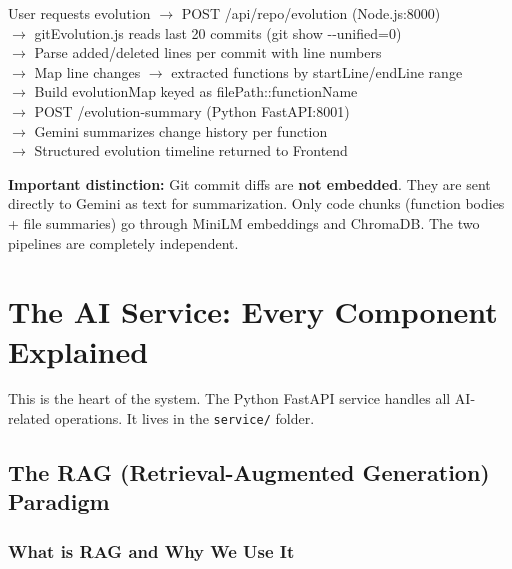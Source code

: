 \documentclass[a4paper,11pt]{article}
\begin{document}
\begin{mdframed}[style=flowbox]
\ttfamily\small
User requests evolution $\rightarrow$ POST /api/repo/evolution (Node.js:8000)\\
\quad$\rightarrow$ gitEvolution.js reads last 20 commits (git show {-}{-}unified=0)\\
\quad$\rightarrow$ Parse added/deleted lines per commit with line numbers\\
\quad$\rightarrow$ Map line changes $\rightarrow$ extracted functions by startLine/endLine range\\
\quad$\rightarrow$ Build evolutionMap keyed as filePath::functionName\\
\quad$\rightarrow$ POST /evolution-summary (Python FastAPI:8001)\\
\quad$\rightarrow$ Gemini summarizes change history per function\\
\quad$\rightarrow$ Structured evolution timeline returned to Frontend
\end{mdframed}

\begin{mdframed}[style=notebox]
\textbf{Important distinction:} Git commit diffs are \textbf{not embedded}. They are sent directly to Gemini as text for summarization. Only code chunks (function bodies + file summaries) go through MiniLM embeddings and ChromaDB. The two pipelines are completely independent.
\end{mdframed}

\newpage

\section{The AI Service: Every Component Explained}

This is the heart of the system. The Python FastAPI service handles all AI-related operations. It lives in the \texttt{service/} folder.

\subsection{The RAG (Retrieval-Augmented Generation) Paradigm}

\subsubsection{What is RAG and Why We Use It}
\end{document}
